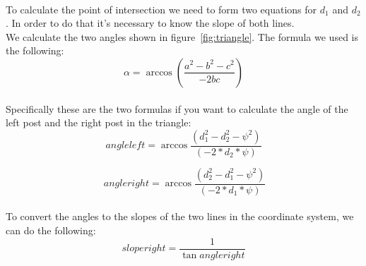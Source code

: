 \documentclass[lnicst,a4paper]{svmultln}
\begin{document}
\\ 
To calculate the point of intersection we need to form two equations for \(d_{1}\) and \(d_{2}\). In order to do that it's necessary to know the slope of both lines. 
\\
We calculate the two angles shown in figure~\ref{fig:triangle}.
The formula we used is the following:
\begin{equation}
	\alpha = \arccos{(\frac{a^2-b^2-c^2}{-2bc})}
	\label{equ:angle1}
\end{equation}
\\
Specifically these are the two formulas if you want to calculate the angle of the left post and the right post in the triangle:
\\
\begin{equation}
	angleleft = \arccos{\frac{(d_{1}^2 - d_{2}^2 - \psi^2)}{(-2*d_{2}*\psi)}}
	\label{equ:angleleft}
\end{equation}

\begin{equation}\
	angleright = \arccos{\frac{(d_{2}^2 - d_{1}^2 - \psi^2)}{(-2*d_{1}*\psi)}}
	\label{equ:angleright}
\end{equation}
\\
To convert the angles to the slopes of the two lines in the coordinate system, we can do the following:\\
\begin{equation}
	sloperight = \frac{1}{\tan{angleright}}
	\label{equ:sloperight}
\end{equation}
\end{document}
